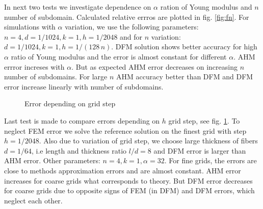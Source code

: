 \documentclass[a4paper]{jpconf}
\begin{document}
In next two tests we investigate dependence on $\alpha$ ration of Young modulus and $n$ number of subdomain. Calculated relative errros are plotted in fig. \ref{fig:fn}. For simulations with $\alpha$ variation, we use the following parameters: $n = 4, d = 1/1024, k = 1, h = 1/2048$ and for $n$ variation: $d = 1/1024, k = 1, h = 1/(128\, n)$. DFM solution shows better accuracy for high $\alpha$ ratio of Young modulus and the error is almost constant for different $\alpha$. AHM errror increses with $\alpha$. But as expected AHM error decreases on increasing $n$ number of subdomains. For large $n$ AHM accuracy better than DFM and DFM error increase linearly with number of subdomains. 

\begin{figure}[H]
    \centering
    \caption{Error depending on grid step}
    \label{fig:h}
\end{figure}

Last test is made to compare errors depending on $h$ grid step, see fig. \ref{fig:h}. To neglect FEM error we solve the reference solution on the finest grid with step $h=1/2048$. Also due to variation of grid step, we choose large thickness of fibers $d=1/64$, i.e length and thickness ratio $l/d=8$ and DFM error is larger than AHM error. Other parameters: $n=4, k=1, \alpha=32$.
For fine grids, the errors are close to methods approximation errors and are almost constant. AHM error increases for coarse grids what corresponds to theory. But DFM error decreases for coarse grids due to opposite signs of FEM (in DFM) and DFM errors, which neglect each other.
\end{document}
